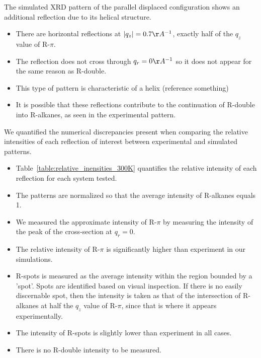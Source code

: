 \documentclass{article}
\begin{document}
  The simulated XRD pattern of the parallel displaced configuration shows an additional
  reflection due to its helical structure. 
  \begin{itemize}
  		\item There are horizontal reflections at $|q_z|= 0.7 \AA^{-1}$, exactly half of 
  		the $q_z$ value of R-$\pi$. 
  		\item The reflection does not cross through $q_r = 0 \AA^{-1}$ so it does not
  		appear for the same reason as R-double. 
  		\item This type of pattern is characteristic of a helix (reference something)
  		\item It is possible that these reflections contribute to the continuation of
  		R-double into R-alkanes, as seen in the experimental pattern. 
  \end{itemize}
  
  We quantified the numerical discrepancies present when comparing the relative intensities
  of each reflection of interest between experimental and simulated patterns. 
  \begin{itemize}
  		\item Table~\ref{table:relative_inensities_300K} quantifies the relative intensity
  		of each reflection for each system tested.
  		\item The patterns are normalized so that the average intensity of R-alkanes equals 1. 
  		\item We measured the approximate intensity of R-$\pi$ by measuring the intensity of 
  		the peak of the cross-section at $q_r=0$. 
  		\item The relative intensity of R-$\pi$ is significantly higher than experiment in our
  		simulations.
  		\item R-spots is measured as the average intensity within the region bounded by a 'spot'.
  		Spots are identified based on visual inspection. If there is no easily discernable spot,
  		then the intensity is taken as that of the intersection of R-alkanes at half the $q_z$
  		value of R-$\pi$, since that is where it appears experimentally. 
  		\item The intensity of R-spots is slightly lower than experiment in all cases.
  		\item There is no R-double intensity to be measured.
  \end{itemize} 
\end{document}
